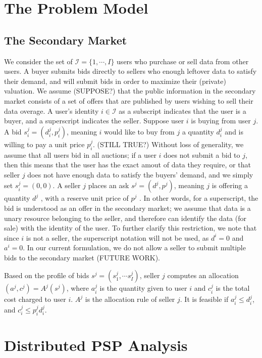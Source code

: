 \documentclass[12pt]{article}
\theoremstyle{definition}
\newcommand{\mcI}{\mathcal{I}}
\begin{document}
\begin{multicols}{2}
\section{The Problem Model}
\subsection{The Secondary Market}

We consider the set of $\mcI = \lbrace 1, \cdots, I\rbrace$ users who purchase or sell
data from other users. A buyer submits bids directly to sellers who enough leftover data
to satisfy their demand, and will submit bids in order to maximize their
(private) valuation. We assume (SUPPOSE?) that the public information in the
secondary market consists of a set of offers that are published by users
wishing to sell their data overage. 
A user's identity $i \in \mcI$ as a subscript indicates that the user
is a buyer, and a superscript indicates the seller.
Suppose user $i$ is buying from user $j$. A bid $s_i^j = (d_i^j, p_i^j)$,
meaning $i$ would like to buy from $j$ a quantity $d^j_i$ and is willing to pay
a unit price $p^j_i$. (STILL TRUE?) Without loss of generality, we assume that all users bid in all
auctions; if a user $i$ does not submit a bid to $j$, then this means that
the user has the exact amout of data they require, or that seller $j$ does not have
enough data to satisfy the buyers' demand, and we simply set $s_i^j = (0, 0)$.
A seller $j$ places an ask $s^j = (d^j, p^j)$, meaning $j$ is offering a
quantity $d^j$ , with a reserve unit price of $p^j$ . In other words, for a
superscript, the bid is understood as an offer in the secondary
market; we assume that data is a unary resource belonging to the seller, and
therefore can identify the data (for sale) with the identity of the user.
To further clarify this restriction, we note that since $i$ is not a seller,
the superscript notation will not be used, as $d^i = 0$ and
$a^i = 0$. In our current formulation, we do not allow a seller to submit
multiple bids to the secondary market (FUTURE WORK).

Based on the profile of bids $s^j = (s^j_1, \cdots s^j_I)$, seller $j$ computes
an allocation $(a^j, c^j) = A^j(s^j)$, where $a^j_i$ is the quantity given to
user $i$ and $c^j_i$ is the total cost charged to user $i$. $A^j$ is the
allocation rule of seller $j$. It is feasible if $a^j_i \le d_i^j$, and $c^j_i \le  p^j_i d_i^j$.

\section{Distributed PSP Analysis}

\end{multicols}
\end{document}
